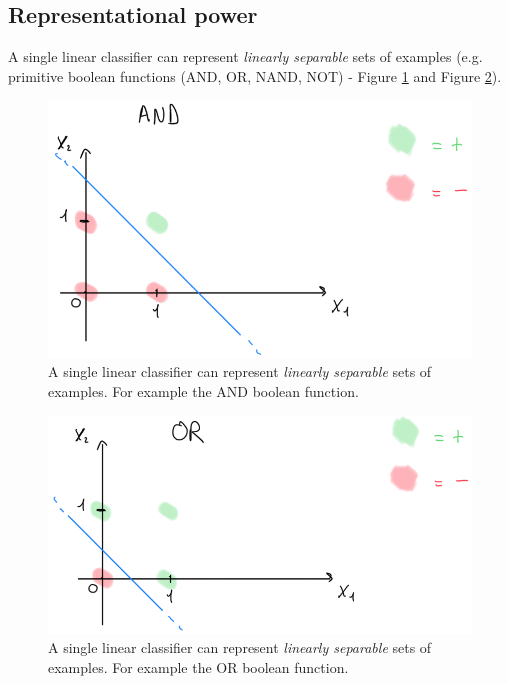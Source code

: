 \subsection{Representational power}
A single linear classifier can represent \textit{linearly separable} sets of examples
(e.g. primitive boolean functions (AND, OR, NAND, NOT) - Figure
\ref{fig:andPerceptron} and Figure \ref{fig:orPerceptron}).

\begin{figure}[H]
	\centering
	\includegraphics[scale=0.5]{
		images/12_LinearDiscriminantFunctions_andPerceptron.png
	}
	\caption{A single linear classifier can represent \textit{linearly separable} sets
	of examples. For example the AND boolean function.}
	\label{fig:andPerceptron}
\end{figure}

\begin{figure}[H]
	\centering
	\includegraphics[scale=0.5]{
		images/12_LinearDiscriminantFunctions_orPerceptron.png
	}
	\caption{A single linear classifier can represent \textit{linearly separable} sets
	of examples. For example the OR boolean function.}
	\label{fig:orPerceptron}
\end{figure}

